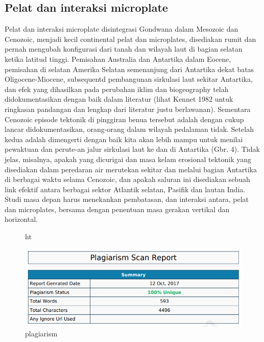 \subsection{Pelat dan interaksi microplate}

		Pelat dan interaksi microplate disintegrasi Gondwana dalam Mesozoic dan Cenozoic, menjadi kecil continental pelat dan microplates, disediakan rumit 
	dan pernah mengubah konfigurasi dari tanah dan wilayah laut di bagian selatan ketika latitud tinggi. Pemisahan Australia dan Antartika dalam Eocene, 
	pemisahan di selatan Amerika Selatan semenanjung dari Antartika dekat batas Oligocene-Miocene, subsequentd pembangunan sirkulasi laut sekitar 
	Antartika, dan efek yang dihasilkan pada perubahan iklim dan biogeography telah didokumentasikan dengan baik dalam literatur (lihat Kennet 1982 untuk 
	ringkasan pandangan dan lengkap dari literatur justu berlawanan). Sementara Cenozoic episode tektonik di pinggiran benua tersebut adalah dengan cukup 
	lancar didokumentasikan, orang-orang dalam wilayah pedalaman tidak. Setelah kedua adalah dimengerti dengan baik kita akan lebih mampu untuk menilai 
	pewaktuan dan perute-an jalur sirkulasi laut ke dan di Antartika (Gbr. 4). Tidak jelas, misalnya, apakah yang dicurigai dan masa kelam erosional tektonik 
	yang disediakan dalam peredaran air merutekan sekitar dan melalui bagian Antartika di berbagai waktu selama Cenozoic, dan apakah saluran ini disediakan 
	sebuah link efektif antara berbagai sektor Atlantik selatan, Pasifik dan lautan India. Studi masa depan harus menekankan pembatasan, dan interaksi antara, 
	pelat dan microplates, bersama dengan penentuan masa gerakan vertikal dan horizontal.
	
	
	
	
\begin{figure}{ht}
\centerline{\includegraphics[width=1\textwidth]{figures/plag.PNG}}
\caption{plagiarism}	
\label{plag}
\end{figure}

	
		
	
	
		
